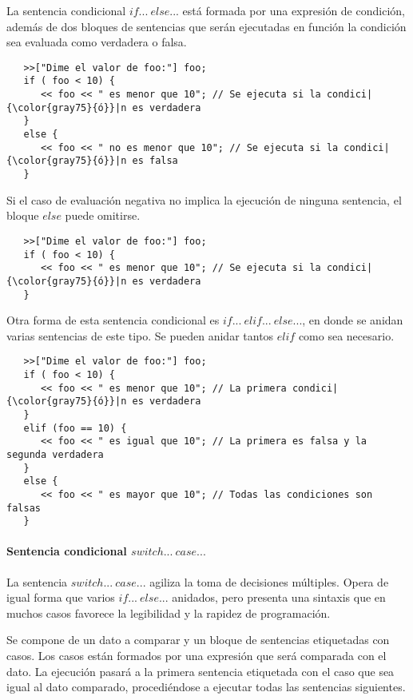 La sentencia condicional $if...\ else...$ está formada por una expresión de condición, además de dos bloques de sentencias que serán ejecutadas en función la condición sea evaluada 
como verdadera o falsa. \\

\begin{lstlisting}
   >>["Dime el valor de foo:"] foo;
   if ( foo < 10) { 
      << foo << " es menor que 10"; // Se ejecuta si la condici|{\color{gray75}{ó}}|n es verdadera
   }
   else {
      << foo << " no es menor que 10"; // Se ejecuta si la condici|{\color{gray75}{ó}}|n es falsa
   }
\end{lstlisting}

Si el caso de evaluación negativa no implica la ejecución de ninguna sentencia, el bloque $else$ puede omitirse. \\

\begin{lstlisting}
   >>["Dime el valor de foo:"] foo;
   if ( foo < 10) { 
      << foo << " es menor que 10"; // Se ejecuta si la condici|{\color{gray75}{ó}}|n es verdadera
   }
\end{lstlisting}

Otra forma de esta sentencia condicional es $if...\ elif...\ else...$, en donde se anidan varias
sentencias de este tipo. Se pueden anidar tantos $elif$ como sea necesario.\\

\begin{lstlisting}
   >>["Dime el valor de foo:"] foo;
   if ( foo < 10) { 
      << foo << " es menor que 10"; // La primera condici|{\color{gray75}{ó}}|n es verdadera
   }
   elif (foo == 10) {
      << foo << " es igual que 10"; // La primera es falsa y la segunda verdadera
   }
   else {
      << foo << " es mayor que 10"; // Todas las condiciones son falsas
   }
\end{lstlisting}

\paragraph{Sentencia condicional $switch...\ case...$}
La sentencia $switch...\ case...$ agiliza la toma de decisiones múltiples. Opera de igual forma que varios 
$if...\ else...$ anidados, pero presenta una sintaxis que en muchos casos favorece la legibilidad y 
la rapidez de programación.

Se compone de un dato a comparar y un bloque de sentencias etiquetadas con casos. Los casos están formados por una expresión que 
será comparada con el dato. La ejecución pasará a la primera sentencia etiquetada
con el caso que sea igual al dato comparado, procediéndose a ejecutar todas las sentencias siguientes. \\

